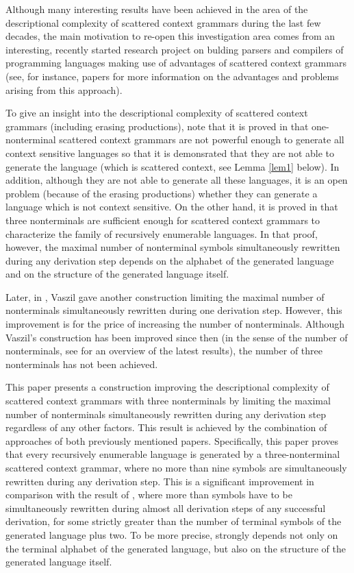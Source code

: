 \documentclass[copyright]{eptcs}
\begin{document}
  Although many interesting results have been achieved in the area of the descriptional complexity of scattered context grammars during the last few decades, the main motivation to re-open this investigation area comes from an interesting, recently started research project on bulding parsers and compilers of programming languages making use of advantages of scattered context grammars (see, for instance, papers \cite{kolar,rychnov} for more information on the advantages and problems arising from this approach).

  To give an insight into the descriptional complexity of scattered context grammars (including erasing productions), note that it is proved in \cite{meduna2} that one\mbox{-}nonterminal scattered context grammars are not powerful enough to generate all context sensitive languages so that it is demonsrated that they are not able to generate the language  (which is scattered context, see Lemma \ref{lem1} below). In addition, although they are not able to generate all these languages, it is an open problem (because of the erasing productions) whether they can generate a language which is not context sensitive. On the other hand, it is proved in \cite{Meduna00b} that three nonterminals are sufficient enough for scattered context grammars to characterize the family of recursively enumerable languages. In that proof, however, the maximal number of nonterminal symbols simultaneously rewritten during any derivation step depends on the alphabet of the generated language and on the structure of the generated language itself.

  Later, in \cite{vaszil}, Vaszil gave another construction limiting the maximal number of nonterminals simultaneously rewritten during one derivation step. However, this improvement is for the price of increasing the number of nonterminals. Although Vaszil's construction has been improved since then (in the sense of the number of nonterminals, see \cite{masopustTCS} for an overview of the latest results), the number of three nonterminals has not been achieved.

  This paper presents a construction improving the descriptional complexity of scattered context grammars with three nonterminals by limiting the maximal number of nonterminals simultaneously rewritten during any derivation step regardless of any other factors. This result is achieved by the combination of approaches of both previously mentioned papers. Specifically, this paper proves that every recursively enumerable language is generated by a three-nonterminal scattered context grammar, where no more than nine symbols are simultaneously rewritten during any derivation step. This is a significant improvement in comparison with the result of \cite{Meduna00b}, where more than  symbols have to be simultaneously rewritten during almost all derivation steps of any successful derivation, for some  strictly greater than the number of terminal symbols of the generated language plus two. To be more precise,  strongly depends not only on the terminal alphabet of the generated language, but also on the structure of the generated language itself.
\end{document}
